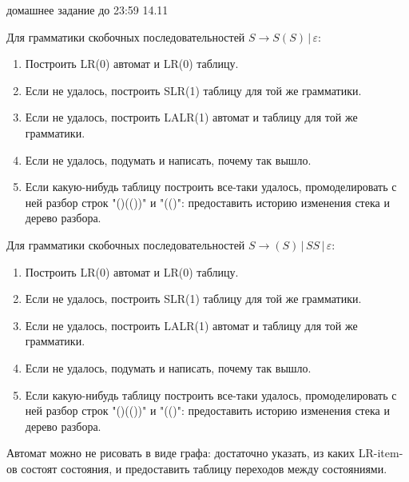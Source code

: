 \documentclass[12pt]{article}
\begin{document}

{\Large домашнее задание до 23:59 14.11}
\bigskip

\enumerate
{
  \item
  
    Для грамматики скобочных последовательностей $ S \rightarrow  S ( S ) \, | \, \varepsilon$:
    
    \begin{enumerate}
        \item Построить LR(0) автомат и LR(0) таблицу.
        \item Если не удалось, построить SLR(1) таблицу для той же грамматики.
        \item Если не удалось, построить LALR(1) автомат и таблицу для той же грамматики.
        \item Если не удалось, подумать и написать, почему так вышло. 
        \item Если какую-нибудь таблицу построить все-таки удалось, промоделировать с ней разбор строк "()(())" и "(()": предоставить историю изменения стека и дерево разбора.
    \end{enumerate} 
   \item Для грамматики скобочных последовательностей $ S \rightarrow  ( S ) \, | \, S S  \, | \, \varepsilon$:
    
    \begin{enumerate}
        \item Построить LR(0) автомат и LR(0) таблицу.
        \item Если не удалось, построить SLR(1) таблицу для той же грамматики.
        \item Если не удалось, построить LALR(1) автомат и таблицу для той же грамматики.
        \item Если не удалось, подумать и написать, почему так вышло. 
        \item Если какую-нибудь таблицу построить все-таки удалось, промоделировать с ней разбор строк "()(())" и "(()": предоставить историю изменения стека и дерево разбора.
    \end{enumerate} 
}

  Автомат можно не рисовать в виде графа: достаточно указать, из каких LR-item-ов состоят состояния, и предоставить таблицу переходов между состояниями. 
\end{document}
